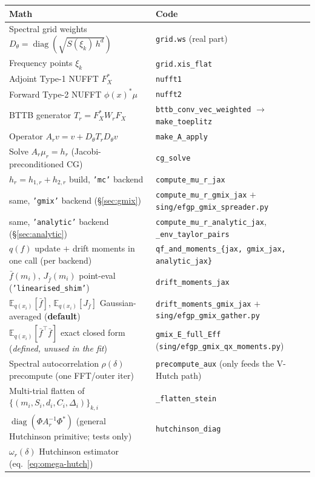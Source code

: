 \documentclass[11pt]{article}
\newcommand{\Eqx}{\mathbb{E}_{q(x_i)}}
\newcommand{\diag}{\operatorname{diag}}
\newcommand{\code}[1]{\texttt{\small #1}}
\begin{document}
\noindent\footnotesize
\begin{tabular}{@{}p{} p{}@{}}
\hline
Math & Code \\
\hline
Spectral grid weights $D_\theta = \diag(\sqrt{S(\xi_k)\,h^d})$
& \code{grid.ws} (real part) \\
Frequency points $\xi_k$
& \code{grid.xis\_flat} \\
Adjoint Type-1 NUFFT $F_X^{*}$
& \code{nufft1} \\
Forward Type-2 NUFFT $\phi(x)^*\mu$
& \code{nufft2} \\
BTTB generator $T_r = F_X^{*}W_r F_X$
& \code{bttb\_conv\_vec\_weighted} $\to$ \code{make\_toeplitz} \\
Operator $A_r v = v + D_\theta T_r D_\theta v$
& \code{make\_A\_apply} \\
Solve $A_r \mu_r = h_r$ (Jacobi-preconditioned CG)
& \code{cg\_solve} \\
$h_r = h_{1,r} + h_{2,r}$ build, \code{'mc'} backend
& \code{compute\_mu\_r\_jax} \\
same, \code{'gmix'} backend (§\ref{sec:gmix})
& \code{compute\_mu\_r\_gmix\_jax} $+$ \code{sing/efgp\_gmix\_spreader.py} \\
same, \code{'analytic'} backend (§\ref{sec:analytic})
& \code{compute\_mu\_r\_analytic\_jax}, \code{\_env\_taylor\_pairs} \\
$q(f)$ update $+$ drift moments in one call (per backend)
& \code{qf\_and\_moments\_\{jax, gmix\_jax, analytic\_jax\}} \\
$\bar f(m_i)$, $J_{\bar f}(m_i)$ point-eval (\code{'linearised\_shim'})
& \code{drift\_moments\_jax} \\
$\Eqx[\bar f]$, $\Eqx[J_{\bar f}]$ Gaussian-averaged (\textbf{default})
& \code{drift\_moments\_gmix\_jax} $+$ \code{sing/efgp\_gmix\_gather.py} \\
$\Eqx[\bar f^\top\bar f]$ exact closed form (\emph{defined, unused in the fit})
& \code{gmix\_E\_full\_Eff} (\code{sing/efgp\_gmix\_qx\_moments.py}) \\
Spectral autocorrelation $\rho(\delta)$ precompute (one FFT/outer iter)
& \code{precompute\_aux} (only feeds the V-Hutch path) \\
Multi-trial flatten of $\{(m_i,S_i,d_i,C_i,\Delta_i)\}_{k,i}$
& \code{\_flatten\_stein} \\
$\diag(\Phi A_r^{-1}\Phi^*)$ (general Hutchinson primitive; tests only)
& \code{hutchinson\_diag} \\
$\omega_r(\delta)$ Hutchinson estimator (eq.~\ref{eq:omega-hutch})

\end{tabular}
\end{document}
